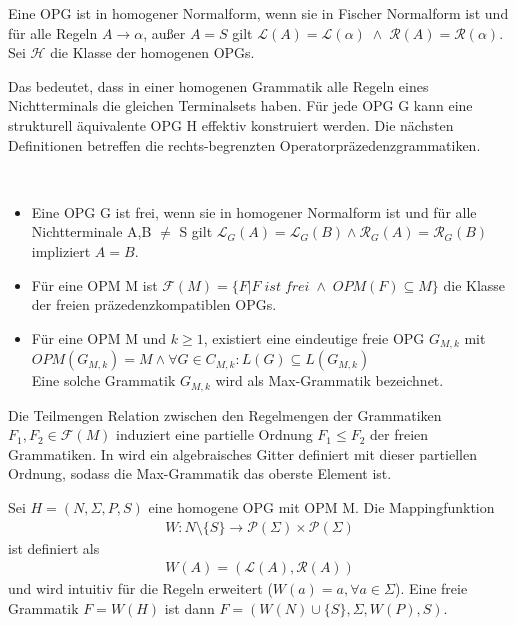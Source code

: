 \begin{definition}
Eine OPG ist in homogener Normalform, wenn sie in Fischer Normalform ist und für alle Regeln $A\rightarrow \alpha$, außer $A=S$ gilt $\mathcal{L}(A) = \mathcal{L}(\alpha) \; \wedge \; \mathcal{R}(A) = \mathcal{R}(\alpha)$.
Sei $\mathcal{H}$ die Klasse der homogenen OPGs.
\end{definition}
Das bedeutet, dass in einer homogenen Grammatik alle Regeln eines Nichtterminals die gleichen Terminalsets haben. Für jede OPG G kann eine strukturell äquivalente OPG H effektiv konstruiert werden. Die nächsten Definitionen betreffen die rechts-begrenzten Operatorpräzedenzgrammatiken.
\begin{definition}\ \\
\begin{itemize}
\item
Eine OPG G ist frei, wenn sie in homogener Normalform ist und für alle Nichtterminale A,B $\neq$ S gilt $\mathcal{L}_G(A) = \mathcal{L}_G(B) \wedge \mathcal{R}_G(A)=\mathcal{R}_G(B)$ impliziert $A=B$.
\item
 Für eine OPM M ist $\mathcal{F}(M)=\{F|F \; ist \; frei \; \wedge \; OPM(F) \subseteq M\}$ die Klasse der freien präzedenzkompatiblen OPGs.
 \item
 Für eine OPM M und $k \geq 1$, existiert eine eindeutige freie OPG $G_{M,k}$ mit $OPM(G_{M,k})= M \wedge \forall G \in C_{M,k}: L(G) \subseteq L(G_{M,k})$ \\
 Eine solche Grammatik $G_{M,k}$ wird als Max-Grammatik bezeichnet.
\end{itemize}
\end{definition}
Die Teilmengen Relation zwischen den Regelmengen der Grammatiken $F_1, F_2 \in \mathcal{F}(M)$ induziert eine partielle Ordnung $F_1 \leq F_2$ der freien Grammatiken. In \cite{algebraic_properties} wird ein algebraisches Gitter definiert mit dieser partiellen Ordnung, sodass die Max-Grammatik das oberste Element ist.

\begin{definition}
Sei $H=(N, \Sigma, P, S)$ eine homogene OPG mit OPM M. Die Mappingfunktion 
\begin{align*}
W: N \setminus \{S\} \rightarrow \mathcal{P}(\Sigma) \times \mathcal{P}(\Sigma)
\end{align*}
ist definiert als
\begin{align*}
W(A)=\left(\mathcal{L}(A), \mathcal{R}(A)\right)
\end{align*}
und wird intuitiv für die Regeln erweitert ($W(a)=a, \forall a\in \Sigma$). Eine freie Grammatik $F=W(H)$ ist dann $F=(W(N) \cup \{S\}, \Sigma, W(P), S)$.
\end{definition}

